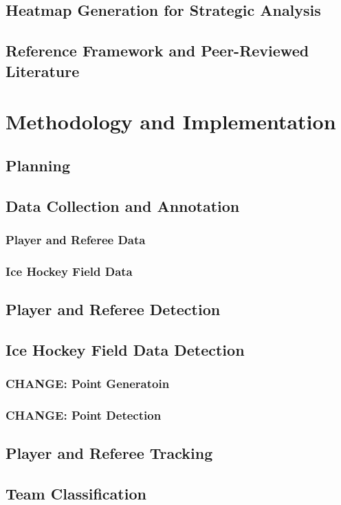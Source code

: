 \documentclass[12pt, letterpaper]{article}
\begin{document}
\subsection{Heatmap Generation for Strategic Analysis}
\subsection{Reference Framework and Peer-Reviewed Literature}
\newpage

\section{Methodology and Implementation}

\subsection{Planning}
\subsection{Data Collection and Annotation}
\subsubsection{Player and Referee Data}
\subsubsection{Ice Hockey Field Data}
\subsection{Player and Referee Detection}
\subsection{Ice Hockey Field Data Detection}
\subsubsection{\textbf{CHANGE}: Point Generatoin}
\subsubsection{\textbf{CHANGE}: Point Detection}
\subsection{Player and Referee Tracking}
\subsection{Team Classification}
\end{document}
